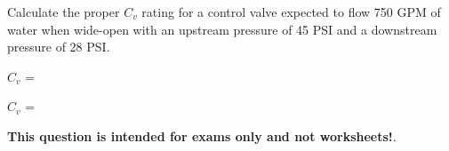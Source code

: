 

Calculate the proper $C_v$ rating for a control valve expected to flow 750 GPM of water when wide-open with an upstream pressure of 45 PSI and a downstream pressure of 28 PSI.

\vskip 10pt

$C_v$ = \underbar{\hskip 50pt}







$C_v$ = 







{\bf This question is intended for exams only and not worksheets!}.



